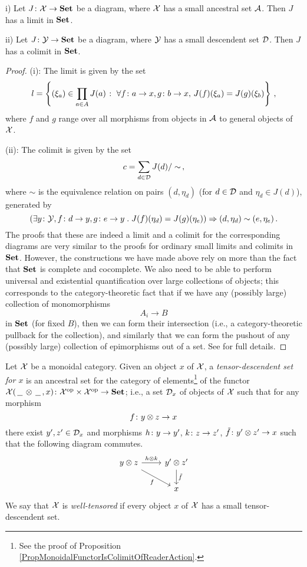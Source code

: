 \begin{proposition}
  i) Let $J \colon \mathcal X \to {\normalfont\textbf{Set}}$ be a diagram, where $\mathcal X$ has a small ancestral set ${\mathcal{A}}$.
  Then $J$ has a limit in ${\normalfont\textbf{Set}}$.

  ii) Let $J\colon \mathcal Y \to {\normalfont\textbf{Set}}$ be a diagram, where $\mathcal Y$ has a small descendent set ${\mathcal{D}}$.
  Then $J$ has a colimit in ${\normalfont\textbf{Set}}$.
  \label{PropAllGoodCategories}
\end{proposition}
\begin{proof}
  (i): The limit is given by the set
  \[
    l = \left\{(\xi_a) \in \prod_{a\in A}J(a) \;\colon\; \forall f \colon a \to x, g \colon b \to x,\,J(f)(\xi_a)=J(g)(\xi_b)\right\}\,,
    \]
  where $f$ and $g$ range over all morphisms from objects in ${\mathcal{A}}$ to general objects of $\mathcal X$.

  (ii): The colimit is given by the set
  \[
    c = \sum_{d \in {\mathcal{D}}} J(d) / \sim\,,
    \]
  where $\sim$ is the equivalence relation on pairs $(d, \eta_d)$ (for $d\in {\mathcal{D}}$ and $\eta_d\in J(d)$), generated by
  \[
    \left(\exists y\colon \mathcal Y, f\colon d \to y,g\colon e \to y \;.\; J(f)(\eta_d) = J(g)(\eta_{e})\right) \mathrel{\Rightarrow} (d,\eta_d) \sim (e,\eta_e)\,.
    \]
  The proofs that these are indeed a limit and a colimit for the corresponding diagrams are very similar to the proofs for ordinary small limits and colimits in ${\normalfont\textbf{Set}}$.  
  However, the constructions we have made above rely on more than the fact that ${\normalfont\textbf{Set}}$ is complete and cocomplete.  
  We also need to be able to perform universal and existential quantification over large collections of objects; this corresponds to the category-theoretic fact that if we have any (possibly large) collection of monomorphisms
  \[
    A_i \to B
    \]
  in ${\normalfont\textbf{Set}}$ (for fixed $B$), then we can form their intersection (i.e., a category-theoretic pullback for the collection), and similarly that we can form the pushout of any (possibly large) collection of epimorphisms out of a set.
  See \cite{AllGoodCategories} for full details.
\end{proof}

\begin{definition}
  Let $\mathcal X$ be a monoidal category.  
  Given an object $x$ of $\mathcal X$, a \emph{tensor-descendent set for $x$} is an ancestral set for the category of elements\footnote{See the proof of Proposition \ref{PropMonoidalFunctorIsColimitOfReaderAction}.} of the functor $\mathcal X(\,\underline{\hspace{1.5ex}}\,\otimes\,\underline{\hspace{1.5ex}}\,,x) \colon \mathcal X^{\mathrm{op}} \times \mathcal X^{\mathrm{op}} \to {\normalfont\textbf{Set}}$; i.e., a set ${\mathcal{D}}_x$ of objects of $\mathcal X$ such that for any morphism
  \[
    f \colon y \otimes z \to x
    \]
  there exist $y',z'\in {\mathcal{D}}_x$ and morphisms $h \colon y \to y'$, $k \colon z \to z'$, $\tilde f \colon y'\otimes z' \to x$ such that the following diagram commutes.
  \[
    \begin{tikzcd}
      y \tensor z \arrow[r, "h \tensor k"] \arrow[dr, "f"']
        & y' \tensor z' \arrow[d, "\tilde f"] \\
        & x
    \end{tikzcd}
    \]
  We say that $\mathcal X$ is \emph{well-tensored} if every object $x$ of $\mathcal X$ has a small tensor-descendent set.
  \label{DefWellTensored}
\end{definition}

